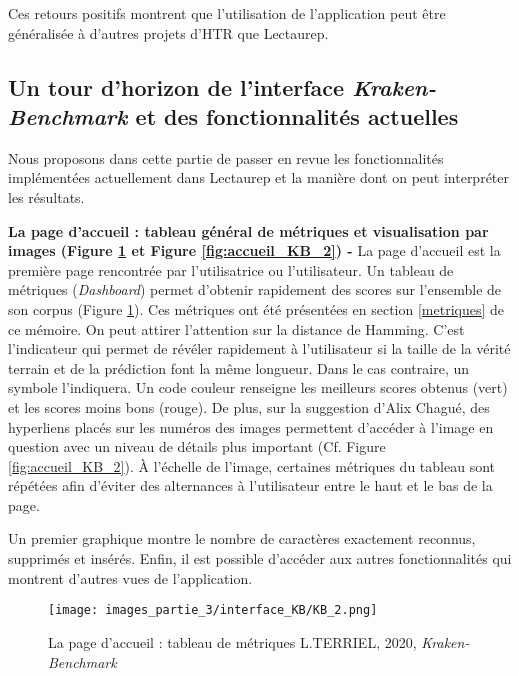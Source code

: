 Ces retours positifs montrent que l'utilisation de l'application peut être généralisée à d'autres projets d'HTR que Lectaurep.\\
\newpage
\subsection{Un tour d'horizon de l'interface \textit{Kraken-Benchmark} et des fonctionnalités actuelles}\label{inter_fonc}
Nous proposons dans cette partie de passer en revue les fonctionnalités implémentées actuellement dans Lectaurep et la manière dont on peut interpréter les résultats.

\textbf{La page d'accueil : tableau général de métriques et visualisation par images (Figure \ref{fig:accueil_KB_1} et Figure \ref{fig:accueil_KB_2}) - } La page d'accueil est la première page rencontrée par l'utilisatrice ou l'utilisateur. Un tableau de métriques (\textit{Dashboard}) permet d'obtenir rapidement des scores sur l'ensemble de son corpus (Figure \ref{fig:accueil_KB_1}). Ces métriques ont été présentées en section \ref{metriques} de ce mémoire. On peut attirer l'attention sur la distance de Hamming. C'est l'indicateur qui permet de révéler rapidement à l'utilisateur si la taille de la vérité terrain et de la prédiction font la même longueur. Dans le cas contraire, un symbole \inquote{$\emptyset$} l'indiquera. Un code couleur renseigne les meilleurs scores obtenus (vert) et les scores moins bons (rouge). De plus, sur la suggestion d'Alix Chagué, des hyperliens placés sur les numéros des images permettent d'accéder à l'image en question avec un niveau de détails plus important (Cf. Figure \ref{fig:accueil_KB_2}). 
À l'échelle de l'image, certaines métriques du tableau sont répétées afin d'éviter des alternances à l'utilisateur entre le haut et le bas de la page.

Un premier graphique montre le nombre de caractères exactement reconnus, supprimés et insérés. Enfin, il est possible d'accéder aux autres fonctionnalités qui montrent d'autres vues de l'application.
\begin{figure}[H]
    \centering
    \texttt{[image: images\_partie\_3/interface\_KB/KB\_2.png]}
        \caption{La page d'accueil : tableau de métriques \textcopyright L.TERRIEL, 2020, \textit{Kraken-Benchmark}}
        \label{fig:accueil_KB_1}
\end{figure}

